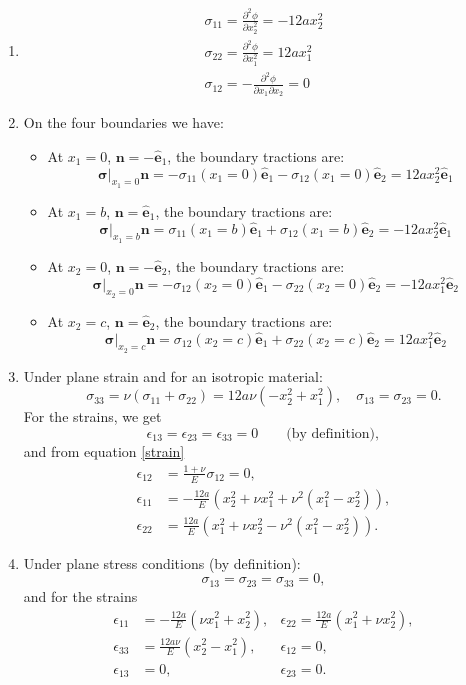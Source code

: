 \documentclass{article}
\newcommand{\ee}{\end{equation}}
\newcommand{\be}{\begin{equation}}
\newcommand{\bi}{\begin{itemize}}
\newcommand{\ei}{\end{itemize}}
\newcommand{\pa}{\partial}
\newcommand{\bs}{\boldsymbol}
\begin{document}
\begin{enumerate}
\item 
\be
\begin{array}{l}
\sigma_{11}=\frac{\pa^2  \phi}{\pa x_2^2}=-12ax_2^2 \\
 \sigma_{22}=\frac{\pa^2  \phi}{\pa x_1^2}=12ax_1^2 \\
\sigma_{12}=-\frac{\pa^2  \phi}{\pa x_1 \pa x_2}=0
\end{array}
\ee


\item On the four boundaries we have:
\bi
\item At $x_1=0$, $\bs{n}=-\bs{\hat{e}}_1$, the boundary tractions are:
\be
\bs{\sigma}|_{x_1=0} \bs{n}=-\sigma_{11}(x_1=0)\bs{\hat{e}}_1-\sigma_{12}(x_1=0)\bs{\hat{e}}_2=12ax_2^2\bs{\hat{e}}_1
\ee
\item At $x_1=b$, $\bs{n}=\bs{\hat{e}}_1$, the boundary tractions are:
\be
\bs{\sigma}|_{x_1=b} \bs{n}=\sigma_{11}(x_1=b)\bs{\hat{e}}_1+\sigma_{12}(x_1=b)\bs{\hat{e}}_2=-12ax_2^2\bs{\hat{e}}_1
\ee
\item At $x_2=0$, $\bs{n}=-\bs{\hat{e}}_2$, the boundary tractions are:
\be
\bs{\sigma}|_{x_2=0} \bs{n}=
-\sigma_{12}(x_2=0)\bs{\hat{e}}_1-\sigma_{22}(x_2=0)\bs{\hat{e}}_2=-12ax_1^2\bs{\hat{e}}_2
\ee
\item At $x_2=c$, $\bs{n}=\bs{\hat{e}}_2$, the boundary tractions are:
\be
\bs{\sigma}|_{x_2=c} \bs{n}=\sigma_{12}(x_2=c)\bs{\hat{e}}_1+\sigma_{22}(x_2=c)\bs{\hat{e}}_2=12ax_1^2\bs{\hat{e}}_2
\ee

\ei


\item Under plane strain and for an isotropic material:
\be
\sigma_{33}=\nu(\sigma_{11}+\sigma_{22})=12a\nu (-x_2^2+x_1^2), \quad \sigma_{13}=\sigma_{23}=0.
\ee
For the strains, we get
\be
\epsilon_{13} = \epsilon_{23} = \epsilon_{33} = 0 \qquad \textrm{(by definition)},
\ee
and from equation \eqref{strain}
\begin{align}
\epsilon_{12} &= \frac{1 + \nu}{E} \sigma_{12} = 0, \\
\epsilon_{11} &= -\frac{12a}{E}\left(x_2^2 + \nu x_1^2 + \nu^2(x_1^2 - x_2^2)\right), \\
\epsilon_{22} &= \frac{12a}{E}\left(x_1^2 + \nu x_2^2 - \nu^2 (x_1^2 - x_2^2)\right).
\end{align}


\item Under plane stress conditions (by definition):
\be
\sigma_{13}=\sigma_{23}=\sigma_{33}=0,
\ee
and for the strains
\begin{align}
\epsilon_{11} &= -\frac{12a}{E}\left(\nu x_1^2 + x_2^2\right), &\epsilon_{22} = \frac{12a}{E}\left(x_1^2 + \nu x_2^2\right), \\
\epsilon_{33} &= \frac{12a\nu}{E}\left(x_2^2 - x_1^2\right), &\epsilon_{12} = 0, \\
\epsilon_{13} &= 0, &\epsilon_{23} = 0.
\end{align}


\end{enumerate}
\end{document}

